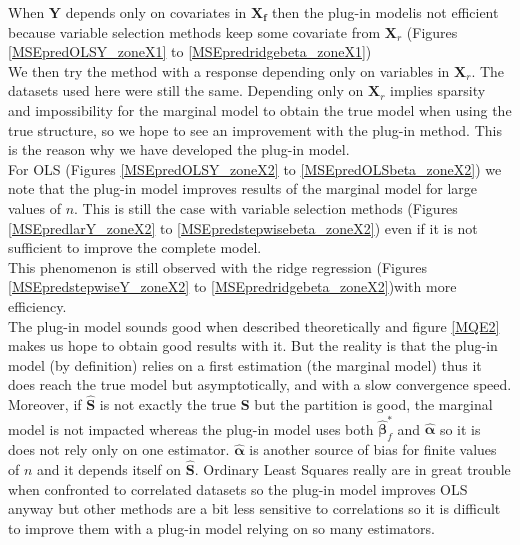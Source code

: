 \documentclass[12pt,a4paper]{report}
\begin{document}
When $\boldsymbol{Y}$ depends only on covariates in $\boldsymbol{X_f}$	 then the plug-in modelis not efficient because variable selection methods keep some covariate from $\boldsymbol{X}_r$ (Figures \ref{MSEpredOLSY_zoneX1} to \ref{MSEpredridgebeta_zoneX1}) \label{tableMSEsimdroitepred}\\

	
	 \label{tableMSEsimgauchepred}
We then try the method with a response depending only on variables in $\boldsymbol{X}_r$. The datasets used here were still the same.
Depending only on $\boldsymbol{X}_r$ implies sparsity and impossibility for the marginal model to obtain the true model when using the true structure, so we hope to see an improvement with the plug-in method. This is the reason why we have developed the plug-in model. \\

For OLS (Figures \ref{MSEpredOLSY_zoneX2} to \ref{MSEpredOLSbeta_zoneX2}) we note that the plug-in model improves results of the marginal model for large values of $n$. This is still the case with variable selection methods (Figures \ref{MSEpredlarY_zoneX2} to \ref{MSEpredstepwisebeta_zoneX2}) even if it is not sufficient to improve the complete model. \\
This phenomenon is still observed with the ridge regression (Figures \ref{MSEpredstepwiseY_zoneX2} to \ref{MSEpredridgebeta_zoneX2})with more efficiency.\\

	The plug-in model sounds good when described theoretically and figure \ref{MQE2} makes us hope to obtain good results with it. But the reality is that the plug-in model (by definition) relies on a first estimation (the marginal model) thus it does reach the true model but asymptotically, and with a slow convergence speed. Moreover, if $\hat{\boldsymbol{S}}$ is not exactly the true $\boldsymbol{S}$ but the partition is good, the marginal model is not impacted whereas the plug-in model uses both $\hat{\boldsymbol{\beta}}^*_{f}$ and $\hat{\boldsymbol{\alpha}}$ so it is does not rely only on one estimator. $\hat{\boldsymbol{\alpha}}$ is another source of bias for finite values of $n$ and it depends itself on $\hat{\boldsymbol{S}}$. Ordinary Least Squares really are in great trouble when confronted to correlated datasets so the plug-in model improves OLS anyway but other methods are a bit less sensitive to correlations so it is difficult to improve them with a plug-in model relying on so many estimators. 

 
 
\end{document}
